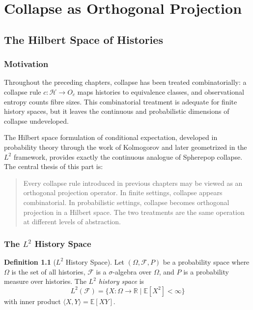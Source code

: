\documentclass[12pt, a4paper, openany]{book}
\theoremstyle{plain}
\theoremstyle{definition}
\newtheorem{definition}[theorem]{Definition}
\theoremstyle{remark}
\newcommand{\calH}{\mathcal{H}}
\begin{document}
\part{Collapse as Orthogonal Projection}

\chapter{The Hilbert Space of Histories}

\section{Motivation}

Throughout the preceding chapters, collapse has been treated combinatorially:
a collapse rule $c : \calH \to O_c$ maps histories to equivalence classes, and
observational entropy counts fibre sizes. This combinatorial treatment is adequate
for finite history spaces, but it leaves the continuous and probabilistic dimensions
of collapse undeveloped.

The Hilbert space formulation of conditional expectation, developed in
probability theory through the work of Kolmogorov and later geometrized in
the $L^2$ framework, provides exactly the continuous analogue of Spherepop
collapse. The central thesis of this part is:

\begin{quote}
Every collapse rule introduced in previous chapters may be viewed as an orthogonal
projection operator. In finite settings, collapse appears combinatorial. In
probabilistic settings, collapse becomes orthogonal projection in a Hilbert space.
The two treatments are the same operation at different levels of abstraction.
\end{quote}

\section{The $L^2$ History Space}

\begin{definition}[$L^2$ History Space]
Let $(\Omega, \mathcal{F}, P)$ be a probability space where $\Omega$ is the
set of all histories, $\mathcal{F}$ is a $\sigma$-algebra over $\Omega$, and
$P$ is a probability measure over histories. The \emph{$L^2$ history space} is
\[
L^2(\mathcal{F}) = \{X : \Omega \to \mathbb{R} \mid \mathbb{E}[X^2] < \infty\}
\]
with inner product $\langle X, Y \rangle = \mathbb{E}[XY]$.
\end{definition}
\end{document}
